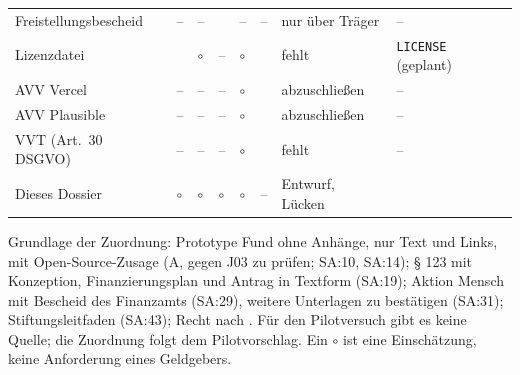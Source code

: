 \documentclass[10pt,parskip=half-]{scrartcl}
\newcommand{\ja}{\textbullet}
\newcommand{\nuetzlich}{$\circ$}
\newcommand{\nein}{--}
\begin{document}
{\begin{longtable}{@{}P{31mm}*{5}{>{\centering\arraybackslash}p{9mm}}P{19mm}P{46mm}@{}}
Freistellungsbescheid & \nein & \nein & \ja & \nein & \nein & nur über Träger & \nein \\
Lizenzdatei & \ja & \nuetzlich & \nein & \nuetzlich & \ja & fehlt & \texttt{LICENSE} (geplant) \\
AVV Vercel & \nein & \nein & \nein & \nuetzlich & \ja & abzuschließen & \nein \\
AVV Plausible & \nein & \nein & \nein & \nuetzlich & \ja & abzuschließen & \nein \\
VVT (Art.~30 DSGVO) & \nein & \nein & \nein & \nuetzlich & \ja & fehlt & \nein \\
Dieses Dossier & \nuetzlich & \nuetzlich & \nuetzlich & \nuetzlich & \nein & Entwurf, Lücken &
   \\
\bottomrule
\end{longtable}
}

Grundlage der Zuordnung: Prototype Fund ohne Anhänge, nur Text und Links, mit
Open-Source-Zusage (A, gegen J03 zu prüfen; SA:10, SA:14); § 123 mit Konzeption, Finanzierungsplan und Antrag in
Textform (SA:19); Aktion Mensch mit Bescheid des Finanzamts (SA:29), weitere Unterlagen zu
bestätigen (SA:31); Stiftungsleitfaden (SA:43); Recht nach . Für den
Pilotversuch gibt es keine Quelle; die Zuordnung folgt dem Pilotvorschlag. Ein
\nuetzlich{} ist eine Einschätzung, keine Anforderung eines Geldgebers.
\end{document}
